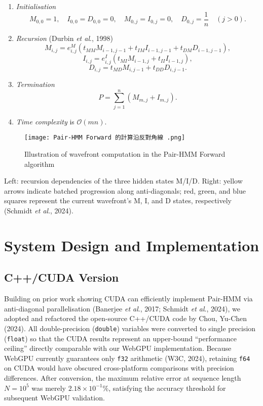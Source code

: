 \documentclass[PhD]{PHlab-thesis}
\begin{document}
\begin{enumerate}
    \item \textit{Initialisation}
    \[
    M_{0,0} = 1, \quad I_{0,0} = D_{0,0} = 0, \quad 
    M_{0,j} = I_{0,j} = 0, \quad D_{0,j} = \frac{1}{n} \quad (j > 0).
    \]
    \item \textit{Recursion} (Durbin \emph{et al}., 1998)
    \[
    M_{i,j} = e_{i,j}^M (t_{MM} M_{i-1,j-1} + t_{IM} I_{i-1,j-1} + t_{DM} D_{i-1,j-1}),
    \]
    \[
    I_{i,j} = e_{i,j}^I (t_{MI} M_{i-1,j} + t_{II} I_{i-1,j}),
    \]
    \[
    D_{i,j} = t_{MD} M_{i,j-1} + t_{DD} D_{i,j-1}.
    \]
    \item \textit{Termination}
    \[
    P = \sum_{j=1}^n (M_{m,j} + I_{m,j}).
    \]
    \item \textit{Time complexity} is $\mathcal{O}(mn)$.
\end{enumerate}

\begin{figure}[htbp]
    \centering
    \texttt{[image: Pair-HMM Forward 的計算沿反對角線 .png]}
    \caption{Illustration of wavefront computation in the Pair-HMM Forward algorithm}
    \label{fig:pairhmm-wavefront}
\end{figure}

Left: recursion dependencies of the three hidden states M/I/D.  
Right: yellow arrows indicate batched progression along anti-diagonals; red, green, and blue squares represent the current wavefront's M, I, and D states, respectively (Schmidt \emph{et al}., 2024).

\section{System Design and Implementation}

\subsection{C++/CUDA Version}
Building on prior work showing CUDA can efficiently implement Pair-HMM via anti-diagonal parallelisation (Banerjee \emph{et al}., 2017; Schmidt \emph{et al}., 2024), we adopted and refactored the open-source C++/CUDA code by Chou, Yu-Chen (2024). All double-precision (\texttt{double}) variables were converted to single precision (\texttt{float}) so that the CUDA results represent an upper-bound “performance ceiling” directly comparable with our WebGPU implementation. Because WebGPU currently guarantees only \texttt{f32} arithmetic (W3C, 2024), retaining \texttt{f64} on CUDA would have obscured cross-platform comparisons with precision differences. After conversion, the maximum relative error at sequence length $N = 10^{5}$ was merely $2.18 \times 10^{-1}\%$, satisfying the accuracy threshold for subsequent WebGPU validation.
\end{document}

